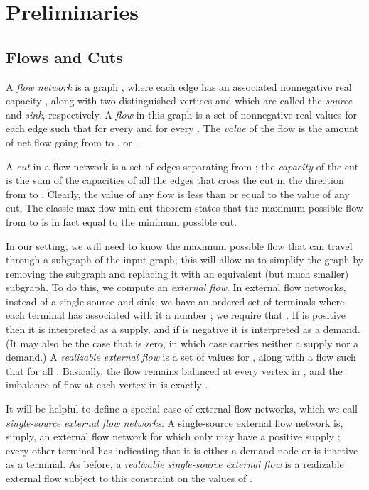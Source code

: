 \documentclass[runningheads]{llncs}
\begin{document}
 \section{Preliminaries}

\subsection{Flows and Cuts}

A \emph{flow network} is a graph , where each edge  has an associated nonnegative real capacity , along with two distinguished vertices  and  which are called the \emph{source} and \emph{sink}, respectively.  A \emph{flow} in this graph is a set of nonnegative real values  for each edge  such that  for every  and  for every .  The \emph{value} of the flow is the amount of net flow going from  to , or . 

A \emph{cut} in a flow network is a set of edges separating  from ; the \emph{capacity} of the cut is the sum of the capacities of all the edges that cross the cut in the direction from  to .  Clearly, the value of any flow is less than or equal to the value of any cut.  The classic max-flow min-cut theorem states that the maximum possible flow from  to  is in fact equal to the minimum possible cut.

In our setting, we will need to know the maximum possible flow that can travel through a subgraph of the input graph; this will allow us to simplify the graph by removing the subgraph and replacing it with an equivalent (but much smaller) subgraph.  To do this, we compute an \emph{external flow}.  In external flow networks, instead of a single source and sink, we have an ordered set of terminals  where each terminal  has associated with it a number ; we require that . If  is positive then it is interpreted as a supply, and if  is negative it is interpreted as a demand. (It may also be the case that  is zero, in which case  carries neither a supply nor a demand.)  A \emph{realizable external flow} is a set of  values  for , along with a flow  such that  for all .  Basically, the flow remains balanced at every vertex in , and the imbalance of flow at each vertex in  is exactly .

It will be helpful to define a special case of external flow networks, which we call \emph{single-source external flow networks}. A single-source external flow network is, simply, an external flow network for which only  may have a positive supply ; every other terminal has  indicating that it is either a demand node or is inactive as a terminal. As before, a \emph{realizable single-source external flow} is a realizable external flow subject to this constraint on the values of .
\end{document}
